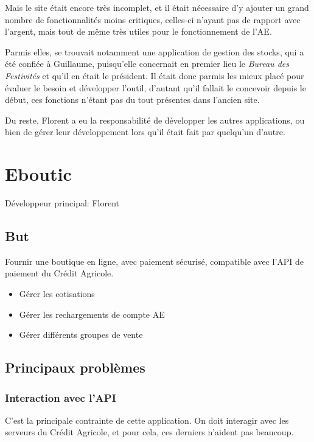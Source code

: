 \documentclass[a4paper]{report}
\begin{document}
\par Mais le site était encore très incomplet, et il était nécessaire d'y ajouter un grand nombre de fonctionnalités
moins critiques, celles-ci n'ayant pas de rapport avec l'argent, mais tout de même très utiles pour le fonctionnement
de l'AE.

\par Parmis elles, se trouvait notamment une application de gestion des stocks, qui a été confiée à Guillaume, puisqu'elle
concernait en premier lieu le \emph{Bureau des Festivités} et qu'il en était le président. Il était donc parmis les
mieux placé pour évaluer le besoin et développer l'outil, d'autant qu'il fallait le concevoir depuis le début, ces
fonctions n'étant pas du tout présentes dans l'ancien site.

\par Du reste, Florent a eu la responsabilité de développer les autres applications, ou bien de gérer leur développement
lors qu'il était fait par quelqu'un d'autre.

\chapter{Eboutic}
\label{sec:eboutic}
\par Développeur principal: Florent

\section{But}
\label{sub:but}
\par Fournir une boutique en ligne, avec paiement sécurisé, compatible avec l'API de paiement du Crédit Agricole.
\begin{itemize}
    \item Gérer les cotisations
    \item Gérer les rechargements de compte AE
    \item Gérer différents groupes de vente
\end{itemize}

\section{Principaux problèmes}
\label{sec:principaux_problemes}

\subsection{Interaction avec l'API}
\label{sub:interaction_avec_l_api}
\par C'est la principale contrainte de cette application. On doit interagir avec les serveurs du Crédit Agricole, et
pour cela, ces derniers n'aident pas beaucoup.
\end{document}
